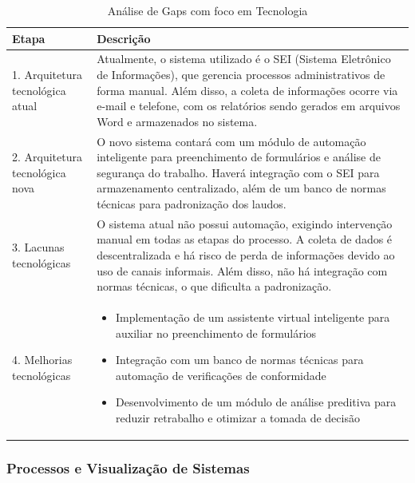\documentclass[12pt,a4paper]{article}
\begin{document}
\begin{table}[htbp]
\centering
\begin{tcolorbox}[enhanced, colback=white, colframe=gray!40, arc=3mm, boxrule=0.5pt, width=0.85\linewidth]
\begin{tabular}{|p{2cm}|p{10cm}|}
\hline
\rowcolor{gray!20}
\textbf{Etapa} & \textbf{Descrição} \\
\hline
1. Arquitetura tecnológica atual & Atualmente, o sistema utilizado é o SEI (Sistema Eletrônico de Informações), que gerencia processos administrativos de forma manual. Além disso, a coleta de informações ocorre via e-mail e telefone, com os relatórios sendo gerados em arquivos Word e armazenados no sistema. \\
\hline
2. Arquitetura tecnológica nova & O novo sistema contará com um módulo de automação inteligente para preenchimento de formulários e análise de segurança do trabalho. Haverá integração com o SEI para armazenamento centralizado, além de um banco de normas técnicas para padronização dos laudos. \\
\hline
3. Lacunas tecnológicas & O sistema atual não possui automação, exigindo intervenção manual em todas as etapas do processo. A coleta de dados é descentralizada e há risco de perda de informações devido ao uso de canais informais. Além disso, não há integração com normas técnicas, o que dificulta a padronização. \\
\hline
4. Melhorias tecnológicas & \begin{itemize}\setlength{\itemsep}{0pt}
\item Implementação de um assistente virtual inteligente para auxiliar no preenchimento de formulários
\item Integração com um banco de normas técnicas para automação de verificações de conformidade
\item Desenvolvimento de um módulo de análise preditiva para reduzir retrabalho e otimizar a tomada de decisão
\end{itemize} \\
\hline
\end{tabular}
\end{tcolorbox}
\caption{Análise de Gaps com foco em Tecnologia}
\end{table}

\subsubsection{Processos e Visualização de Sistemas}
\end{document}
